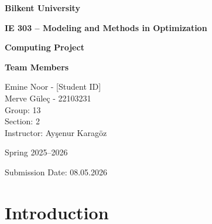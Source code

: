 \documentclass[11pt,a4paper]{article}
\begin{document}
\begin{titlepage}
    \centering

    \vspace*{0.2cm}
    \vspace{0.6cm}

    {\LARGE\bfseries Bilkent University\par}

    \vspace{0.5cm}

    {\Large\bfseries IE 303 -- Modeling and Methods in Optimization\par}
    \vspace{0.15cm}
    {\Large\bfseries Computing Project\par}

    \vspace{1.1cm}

    \begin{flushleft}
        {\large\bfseries Team Members}

        \vspace{0.45cm}

        {\large Emine Noor - [Student ID]}\\[0.18cm]
        {\large Merve Güleç - 22103231}\\[0.6cm]

        {\large Group: 13}\\[0.35cm]
        {\large Section: 2}\\[0.35cm]
        {\large Instructor: Ayşenur Karagöz}
    \end{flushleft}

    \vfill

    {\large Spring 2025--2026\par}
    \vspace{0.1cm}
    {\large Submission Date: 08.05.2026\par}

\end{titlepage}

\tableofcontents
\newpage

\section*{Introduction}
\end{document}

